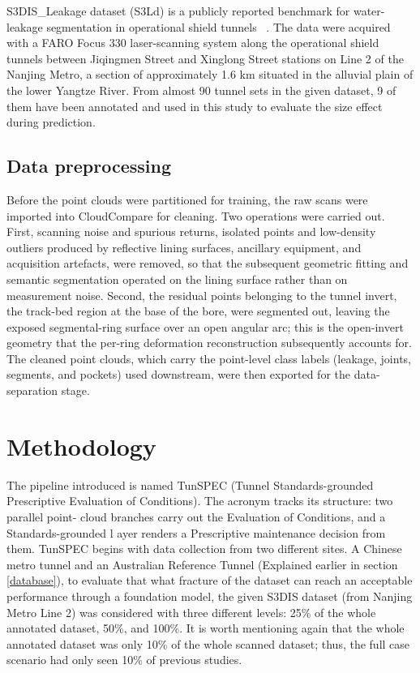 \documentclass[preprint,12pt,authoryear]{elsarticle}
\begin{document}
S3DIS\_Leakage dataset (S3Ld) is a publicly reported benchmark for
water-leakage segmentation in operational shield tunnels ~\citep{Jiang2025a, Jiang2025b}. The data were acquired with a FARO Focus 330
laser-scanning system along the operational shield tunnels between
Jiqingmen Street and Xinglong Street stations on Line 2 of the Nanjing
Metro, a section of approximately 1.6 km situated in the alluvial plain
of the lower Yangtze River. From almost 90 tunnel sets in the
given dataset, 9 of them have been annotated and used in this study to
evaluate the size effect during prediction.



\subsection{Data preprocessing}\label{data-preprocessing}

Before the point clouds were partitioned for training, the raw scans
were imported into CloudCompare for cleaning. Two operations were
carried out. First, scanning noise and spurious returns, isolated points
and low-density outliers produced by reflective lining surfaces,
ancillary equipment, and acquisition artefacts, were removed, so that
the subsequent geometric fitting and semantic segmentation operated on
the lining surface rather than on measurement noise. Second, the
residual points belonging to the tunnel invert, the track-bed region at
the base of the bore, were segmented out, leaving the exposed
segmental-ring surface over an open angular arc; this is the open-invert
geometry that the per-ring deformation reconstruction subsequently
accounts for. The cleaned point clouds, which carry the point-level
class labels (leakage, joints, segments, and pockets) used downstream,
were then exported for the data-separation stage.

\section{Methodology}\label{methodology}

The pipeline introduced is named TunSPEC  (Tunnel Standards-grounded Prescriptive 
Evaluation of Conditions). The acronym tracks its structure: two parallel point-
cloud branches carry out the Evaluation of Conditions, and a Standards-grounded l
ayer renders a Prescriptive maintenance decision from them. 
TunSPEC begins with data collection from two different sites. A
Chinese metro tunnel and an Australian Reference Tunnel (Explained
earlier in section \ref{database}), to evaluate that what fracture of the dataset can
reach an acceptable performance through a foundation model, the given
S3DIS dataset (from Nanjing Metro Line 2) was considered with three
different levels: 25\% of the whole annotated dataset, 50\%, and 100\%.
It is worth mentioning again that the whole annotated dataset was only
10\% of the whole scanned dataset; thus, the full case scenario had only
seen 10\% of previous studies.
\end{document}
